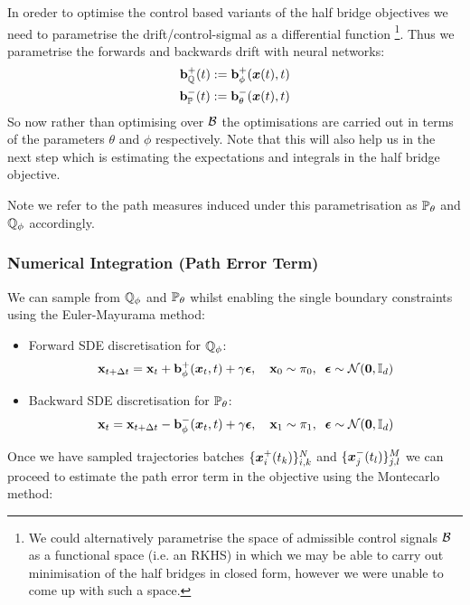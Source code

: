 \documentclass[a4paper,12pt,twoside,openright]{report}
\theoremstyle{definition}
\begin{document}
In oreder to optimise the control based variants of the half bridge objectives we need to parametrise the drift/control-sigmal as a differential function \footnote{We could alternatively parametrise the space of admissible control signals $\calB$ as a functional space (i.e. an  RKHS) in which we may be able to carry out minimisation of the half bridges in closed form, however we were unable to come up with such a space.}. Thus we parametrise the forwards and backwards drift with neural networks:
\begin{align}
    \rvb^{+}_{\Q}(t) := \rvb^{+}_{\phi}(\vx(t), t) \nonumber \\
    \rvb^{-}_{\P}(t) := \rvb^{-}_{\theta}(\vx(t), t)
\end{align}
So now rather than optimising over $\calB$ the optimisations are carried out in terms of the parameters $\theta$ and $\phi$ respectively. Note that this will also help us in the next step which is estimating the expectations and integrals in the half bridge objective.

Note we refer to the path measures induced under this parametrisation as $\P_{\theta}$ and $\Q_{\phi}$ accordingly.

\subsubsection{Numerical Integration (Path Error Term)}
We can sample from $\Q_{\phi}$ and $\P_{\theta}$ whilst enabling the single boundary constraints using the Euler-Mayurama method:
\begin{itemize}
    \item  Forward SDE discretisation for $\Q_{\phi}$:
\begin{align*}
    \rvx_{t + \Delta t} = \rvx_t + \rvb^{+}_{\phi}(\vx_t, t) + \gamma \rvepsilon, \quad \rvx_0 \sim \pi_0, \;\;\rvepsilon \sim \calN(\vzero, \I) 
\end{align*}
    \item  Backward SDE discretisation for $\P_{\theta}$:
\begin{align*}
    \rvx_{t} = \rvx_{t+\Delta t} - \rvb^{-}_{\phi}(\vx_t, t) + \gamma \rvepsilon, \quad \rvx_1 \sim \pi_1,\;\; \rvepsilon \sim \calN(\vzero, \I)
\end{align*}
\end{itemize}

Once we have sampled trajectories batches $\{\vx^{+}_i(t_k)\}_{i,k}^N$ and $\{\vx^{-}_j(t_l)\}_{j,l}^M$ we can proceed to estimate the path error term in the objective using the Montecarlo method:
\end{document}
